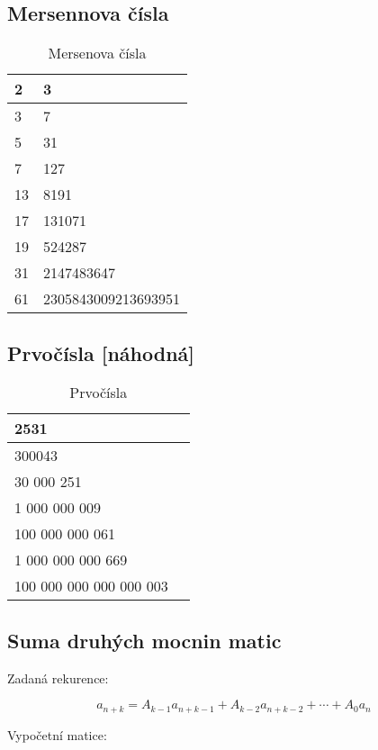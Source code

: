 \documentclass[11pt]{article}
\begin{document}
\subsection{Mersennova čísla}
\begin{table}[H]
\centering
\caption{Mersenova čísla}
\begin{tabular}{|l|l|}
\hline
 2&3  \\ \hline
 3&7  \\ \hline
 5&31  \\ \hline
 7&127  \\ \hline
 13&8191  \\ \hline
 17&131071  \\ \hline
 19&524287  \\ \hline
 31&2147483647  \\ \hline
 61&2305843009213693951  \\ \hline
\end{tabular}
\end{table}
\subsection{Prvočísla [náhodná]}
\begin{table}[H]
\centering
\caption{Prvočísla}
\begin{tabular}{|l|l|}
\hline
 2531  \\ \hline
 300043 \\\hline
 30 000 251 \\\hline
 1 000 000 009  \\ \hline
 100 000 000 061 \\\hline
 1 000 000 000 669 \\\hline
 100 000 000 000 000 003 \\\hline
 
\end{tabular}
\end{table}
\subsection{Suma druhých mocnin matic}
Zadaná rekurence:

\[ a_{n+k} = A_{k-1} a_{n+k-1} + A_{k-2} a_{n+k-2} + \cdots + A_{0} a_{n} \]

Vypočetní matice:
\end{document}

